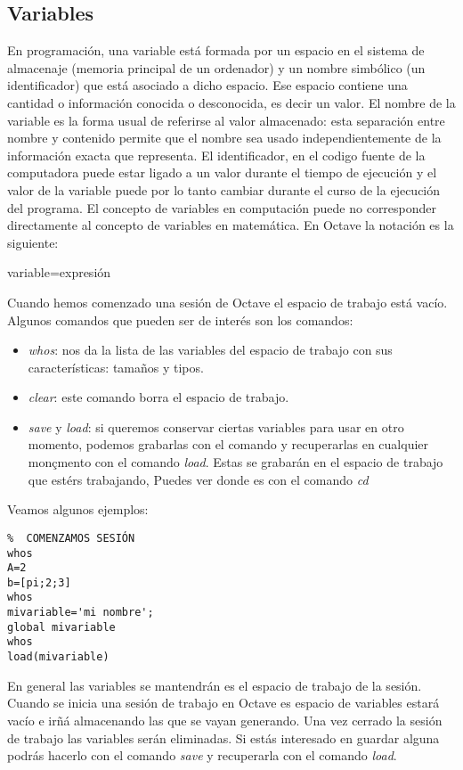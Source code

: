 \subsection{Variables}
En programación, una variable está formada por un espacio en el
sistema de almacenaje (memoria principal de un ordenador) y un nombre
simbólico (un identificador) que está asociado a dicho espacio. Ese
espacio contiene una cantidad o información conocida o desconocida, es
decir un valor. El nombre de la variable es la forma usual de
referirse al valor almacenado: esta separación entre nombre y
contenido permite que el nombre sea usado independientemente de la
información exacta que representa. El identificador, en el codigo
fuente de la computadora puede estar ligado a un valor durante el
tiempo de ejecución y el valor de la variable puede por lo tanto
cambiar durante el curso de la ejecución del programa. El concepto de
variables en computación puede no corresponder directamente al
concepto de variables en matemática. En Octave la notación es la
siguiente:
\begin{mybox}
variable=expresión
\end{mybox}
Cuando hemos comenzado una sesión de Octave el espacio de trabajo está
vacío. Algunos comandos que pueden ser de interés son los comandos:
\begin{itemize}
\item \textit{whos}: nos da la lista de las variables del espacio de trabajo con sus características: tamaños y tipos.
\item \textit{clear}: este comando borra el espacio de trabajo.
\item \textit{save} y \textit{load}: si queremos conservar ciertas
  variables para usar en otro momento, podemos grabarlas con el
  comando  y recuperarlas en cualquier monçmento con el
  comando \textit{load}. Estas se grabarán en el espacio de trabajo
  que estérs trabajando, Puedes ver donde es con el comando
  \textit{cd}
\end{itemize}
Veamos algunos ejemplos:
\begin{octavebox}
\begin{verbatim}
%  COMENZAMOS SESIÓN
whos
A=2
b=[pi;2;3]
whos
mivariable='mi nombre';
global mivariable
whos
load(mivariable)
\end{verbatim}
\end{octavebox}
En general las variables se mantendrán es el espacio de trabajo de la sesión. Cuando se inicia una sesión de trabajo en Octave es espacio de variables estará vacío e irñá almacenando las que se vayan generando. Una vez cerrado la sesión de trabajo las variables serán eliminadas. Si estás interesado en guardar alguna podrás hacerlo con el comando \textit{save} y recuperarla con el comando \textit{load}.

